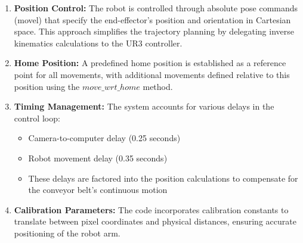 \documentclass[a4paper, 10pt]{article}
\begin{document}
\begin{enumerate}
    
    \item \textbf{Position Control:} The robot is controlled through absolute pose commands (movel) that specify the end-effector's position and orientation in Cartesian space. This approach simplifies the trajectory planning by delegating inverse kinematics calculations to the UR3 controller.
    
    \item \textbf{Home Position:} A predefined home position is established as a reference point for all movements, with additional movements defined relative to this position using the $move\_wrt\_home$ method.

    \item \textbf{Timing Management:} The system accounts for various delays in the control loop:
    
    \begin{itemize}
        \item Camera-to-computer delay (0.25 seconds)
        \item Robot movement delay (0.35 seconds)
        \item These delays are factored into the position calculations to compensate for the conveyor belt's continuous motion 
    \end{itemize}

    \item \textbf{Calibration Parameters:} The code incorporates calibration constants to translate between pixel coordinates and physical distances, ensuring accurate positioning of the robot arm.

\end{enumerate}
\end{document}
